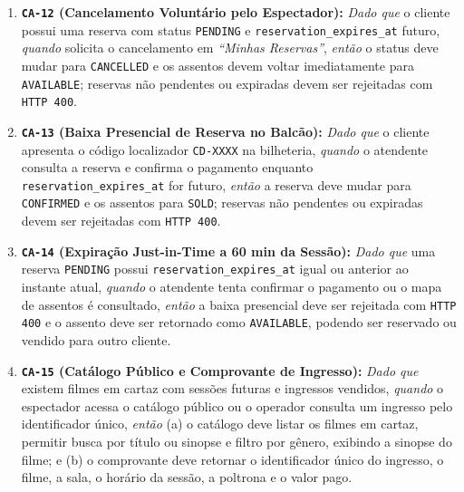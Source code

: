 \begin{enumerate}
\item \textbf{\texttt{CA-12} (Cancelamento Voluntário pelo Espectador):} \emph{Dado que} o cliente possui uma reserva com status \texttt{PENDING} e \texttt{reservation\_\allowbreak\hspace{0pt plus 1pt}expires\_\allowbreak\hspace{0pt plus 1pt}at} futuro, \emph{quando} solicita o cancelamento em \emph{``Minhas Reservas''}, \emph{então} o status deve mudar para \texttt{CANCELLED} e os assentos devem voltar imediatamente para \texttt{AVAILABLE}; reservas não pendentes ou expiradas devem ser rejeitadas com \texttt{HTTP 400}.
\item \textbf{\texttt{CA-13} (Baixa Presencial de Reserva no Balcão):} \emph{Dado que} o cliente apresenta o código localizador \texttt{CD-XXXX} na bilheteria, \emph{quando} o atendente consulta a reserva e confirma o pagamento enquanto \texttt{reservation\_\allowbreak\hspace{0pt plus 1pt}expires\_\allowbreak\hspace{0pt plus 1pt}at} for futuro, \emph{então} a reserva deve mudar para \texttt{CONFIRMED} e os assentos para \texttt{SOLD}; reservas não pendentes ou expiradas devem ser rejeitadas com \texttt{HTTP 400}.
\item \textbf{\texttt{CA-14} (Expiração Just-in-Time a 60 min da Sessão):} \emph{Dado que} uma reserva \texttt{PENDING} possui \texttt{reservation\_\allowbreak\hspace{0pt plus 1pt}expires\_\allowbreak\hspace{0pt plus 1pt}at} igual ou anterior ao instante atual, \emph{quando} o atendente tenta confirmar o pagamento ou o mapa de assentos é consultado, \emph{então} a baixa presencial deve ser rejeitada com \texttt{HTTP 400} e o assento deve ser retornado como \texttt{AVAILABLE}, podendo ser reservado ou vendido para outro cliente.
\item \textbf{\texttt{CA-15} (Catálogo Público e Comprovante de Ingresso):} \emph{Dado que} existem filmes em cartaz com sessões futuras e ingressos vendidos, \emph{quando} o espectador acessa o catálogo público ou o operador consulta um ingresso pelo identificador único, \emph{então} (a) o catálogo deve listar os filmes em cartaz, permitir busca por título ou sinopse e filtro por gênero, exibindo a sinopse do filme; e (b) o comprovante deve retornar o identificador único do ingresso, o filme, a sala, o horário da sessão, a poltrona e o valor pago.
\end{enumerate}

